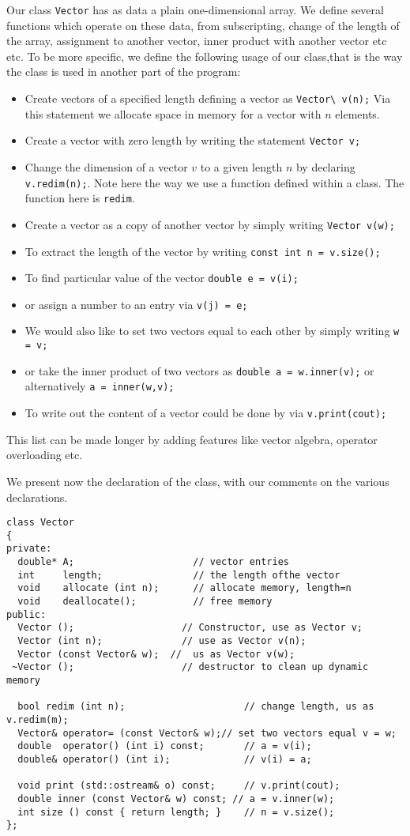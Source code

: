 Our class \verb?Vector? has as data a plain one-dimensional array.
We define several functions which operate on these data, from
subscripting, change of the length of the array, assignment to another vector, inner product with another vector etc etc.
To be more specific, we define the following usage of our class,that is the way the class is used in another part of the 
program:
\begin{itemize}
\item  Create vectors of a specified length defining a vector as 
\verb?Vector\ v(n);?  Via this statement we allocate space in memory for a 
vector with $n$ elements. 
\item Create a vector with zero length by writing the statement \verb?Vector v;?
\item Change the dimension of a vector $v$ to a given length $n$ by declaring
\verb?v.redim(n);?. 
Note here the way we use a function defined within a class. The function here is 
\verb?redim?.
\item
Create a vector as a copy of another vector  by simply writing 
\verb?Vector v(w);?
\item  To  extract the length of the vector by writing
\verb?const int n = v.size();?
\item To find particular value of the vector \verb?double e = v(i);?
\item or assign a number to an entry via \verb?v(j) = e;?
\item  We would also like to set two vectors equal to each other by simply writing 
\verb?w = v;?
\item  or 
take the inner product of two vectors as 
\verb?double a = w.inner(v);? or alternatively \verb?a = inner(w,v);?
\item  To write out the content of a vector could be done by via 
\verb?v.print(cout);?
\end{itemize}
This list can be made longer by adding features like vector algebra, operator overloading etc.

We present now the declaration of the class, with our comments on the various declarations. 
\begin{lstlisting}
class Vector
{
private:
  double* A;                     // vector entries
  int     length;                // the length ofthe vector
  void    allocate (int n);      // allocate memory, length=n
  void    deallocate();          // free memory
public:
  Vector ();                   // Constructor, use as Vector v;
  Vector (int n);              // use as Vector v(n);
  Vector (const Vector& w);  //  us as Vector v(w);
 ~Vector ();                   // destructor to clean up dynamic memory

  bool redim (int n);                     // change length, us as v.redim(m);
  Vector& operator= (const Vector& w);// set two vectors equal v = w;
  double  operator() (int i) const;       // a = v(i);
  double& operator() (int i);             // v(i) = a;

  void print (std::ostream& o) const;     // v.print(cout);
  double inner (const Vector& w) const; // a = v.inner(w);
  int size () const { return length; }    // n = v.size();
};
\end{lstlisting}

